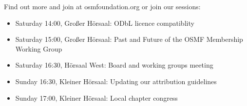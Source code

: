 \begin{landscape}
{    Find out more and join at osmfoundation.org
    or join our sessions:
    \begin{itemize}
      \RaggedRight
      \setlength{\itemsep}{-3pt} %
      \item Saturday 14:00, Großer Hörsaal: ODbL licence compatiblity
      \item Saturday 15:00, Großer Hörsaal: Past and Future of the OSMF Membership Working Group
      \item Saturday 16:30, Hörsaal West: Board and working groups meeting
      \item Sunday 16:30, Kleiner Hörsaal: Updating our attribution guidelines
      \item Sunday 17:00, Kleiner Hörsaal: Local chapter congress
    \end{itemize}
    \justifying
  }%


  \setlength{\fboxsep}{4.5pt}%
  \vspace{0.5\baselineskip}%
  \noindent%
  \hspace{-0.3mm}%
  \setlength{\fboxsep}{3pt}

\end{landscape}

\newpage
